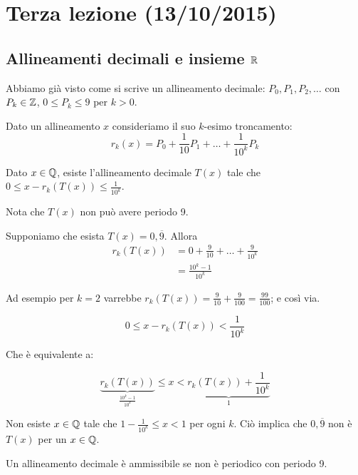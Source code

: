 \chapter{Terza lezione (13/10/2015)}

\section{Allineamenti decimali e insieme $\mathbb R$}

Abbiamo già visto come si scrive un allineamento decimale: $P_0, P_1, P_2, \dots$ con $P_k \in \mathbb Z$, $0 \le P_k \le 9$ per $k > 0$.

Dato un allineamento $x$ consideriamo il suo $k$-esimo troncamento: 
\begin{equation*}
r_k(x) = P_0 + \frac{1}{10}P_1 + \ldots + \frac{1}{10^k}P_k
\end{equation*}

Dato $x \in \mathbb Q$, esiste l'allineamento decimale $T(x)$ tale che $0 \le x - r_k(T(x)) \le \frac{1}{10^k}$.

Nota che $T(x)$ non può avere periodo 9.

\begin{example}
Supponiamo che esista $T(x) = 0,\overline{9}$. Allora
\begin{align*}
r_k(T(x)) &= 0 + \frac{9}{10} + \ldots + \frac{9}{10^k} \\
&= \frac{10^k-1}{10^k}
\end{align*}

Ad esempio per $k = 2$ varrebbe $r_k(T(x)) = \frac{9}{10} + \frac{9}{100} = \frac{99}{100}$; e così via.

\begin{equation*}
0 \le x - r_k(T(x)) < \frac{1}{10^k}
\end{equation*}

Che è equivalente a:

\begin{equation*}
\underbrace{r_k(T(x))}_{\frac{10^k-1}{10^k}} \le x < \underbrace{r_k(T(x)) + \frac{1}{10^k}}_{1}
\end{equation*}

Non esiste $x \in \mathbb Q$ tale che $1 - \frac{1}{10^k} \le x < 1$ per ogni $k$. Ciò implica che $0,\overline{9}$ non è $T(x)$ per un $x \in \mathbb Q$.

\end{example}

\begin{definition}
Un allineamento decimale è ammissibile se non è periodico con periodo 9.
\end{definition}


